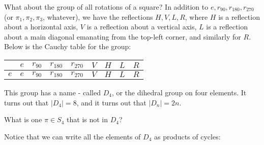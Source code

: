 \documentclass[11pt,twosided]{article}
\begin{document}
What about the group of all rotations of a square? In addition to $e, r_{90}, r_{180}, r_{270}$ (or $ \pi_1, \pi_2, \pi_3$, whatever), we have the reflections $H, V, L, R$, where $H$ is a reflection about a horizontal axis, $V$ is a reflection about a vertical axis, $L$ is a reflection about a main diagonal emanating from the top-left corner, and similarly for $R$. Below is the Cauchy table for the group: 
\begin{center}
\begin{tabular}{c|c c c c c c c c}
    & $e$ & $r_{90}$ & $r_{180}$ & $r_{270}$ & $V$ & $H$ & $L$ & $R$  \\ \hline 
$e$ & $e$ & $r_{90}$ & $r_{180}$ & $r_{270}$ & $V$ & $H$ & $L$ & $R$ \\ 

\end{tabular}
\end{center}

This group has a name - called $D_4$, or the dihedral group on four elements. It turns out that $|D_4| = 8$, and it turns out that $|D_n| = 2n$. 

What is one $\pi \in S_4$ that is not in $D_4$? 

Notice that we can write all the elements of $D_4$ as products of cycles: 
\end{document}
